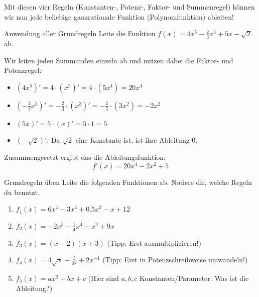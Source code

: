Mit diesen vier Regeln (Konstanten-, Potenz-, Faktor- und Summenregel) können wir nun jede beliebige ganzrationale Funktion (Polynomfunktion) ableiten!

\begin{beispielumgebung}{Anwendung aller Grundregeln}
Leite die Funktion $f(x) = 4x^5 - \frac{2}{3}x^3 + 5x - \sqrt{2}$ ab.

Wir leiten jeden Summanden einzeln ab und nutzen dabei die Faktor- und Potenzregel:
\begin{itemize}
    \item $(4x^5)' = 4 \cdot (x^5)' = 4 \cdot (5x^4) = 20x^4$
    \item $(-\frac{2}{3}x^3)' = -\frac{2}{3} \cdot (x^3)' = -\frac{2}{3} \cdot (3x^2) = -2x^2$
    \item $(5x)' = 5 \cdot (x)' = 5 \cdot 1 = 5$
    \item $(-\sqrt{2})'$: Da $\sqrt{2}$ eine Konstante ist, ist ihre Ableitung $0$.
\end{itemize}
Zusammengesetzt ergibt das die Ableitungsfunktion:
\[ f'(x) = 20x^4 - 2x^2 + 5 \]
\end{beispielumgebung}

\begin{aufgabenumgebung}[A:EinfacheAbleitungen]{Grundregeln üben}
Leite die folgenden Funktionen ab. Notiere dir, welche Regeln du benutzt.
\begin{enumerate}
    \item $f_1(x) = 6x^4 - 3x^3 + 0.5x^2 - x + 12$
    \item $f_2(x) = -2x^5 + \frac{1}{4}x^4 - x^2 + 9x$
    \item $f_3(x) = (x-2)(x+3)$ (Tipp: Erst ausmultiplizieren!)
    \item $f_4(x) = 4\sqrt{x} - \frac{3}{x^2} + 2x^{-1}$ (Tipp: Erst in Potenzschreibweise umwandeln!)
    \item $f_5(x) = ax^2 + bx + c$ (Hier sind $a,b,c$ Konstanten/Parameter. Was ist die Ableitung?)
\end{enumerate}
\end{aufgabenumgebung}


